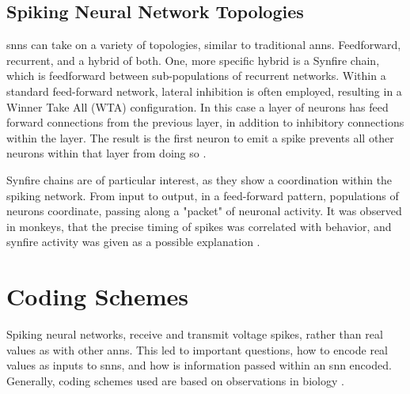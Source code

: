 
    
    \subsection{Spiking Neural Network Topologies}
    \glspl{snn} can take on a variety of topologies, similar to traditional
    \glspl{ann}. Feedforward, recurrent, and a hybrid of both. One, more specific
    hybrid is a Synfire chain, which is feedforward between sub-populations of
    recurrent networks. Within a standard feed-forward network, lateral
    inhibition is often employed, resulting in a Winner Take All (WTA)
    configuration. In this case a layer of neurons has feed forward connections
    from the previous layer, in addition to inhibitory connections within the
    layer. The result is the first neuron to emit a spike prevents all other
    neurons within that layer from doing so \parencite{ponulak_2011}.
    
    Synfire chains are of particular interest, as they show a coordination
    within the spiking network. From input to output, in a feed-forward pattern,
    populations of neurons coordinate, passing along a "packet" of neuronal
    activity. It was observed in monkeys, that the precise timing of spikes was
    correlated with behavior, and synfire activity was given as a possible
    explanation \parencite{aertsen_1996}.
    
    \section{Coding Schemes}
    Spiking neural networks, receive and transmit voltage spikes, rather than
    real values as with other \glspl{ann}. This led to important
    questions, how to encode real values as inputs to \glspl{snn}, and how is
    information passed within an \gls{snn} encoded. Generally, coding schemes
    used are based on observations in biology \parencite{ponulak_2011}.
    
